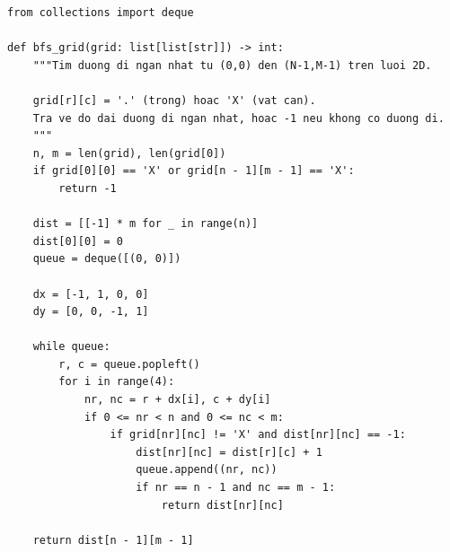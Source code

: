 \begin{lstlisting}
from collections import deque

def bfs_grid(grid: list[list[str]]) -> int:
    """Tim duong di ngan nhat tu (0,0) den (N-1,M-1) tren luoi 2D.

    grid[r][c] = '.' (trong) hoac 'X' (vat can).
    Tra ve do dai duong di ngan nhat, hoac -1 neu khong co duong di.
    """
    n, m = len(grid), len(grid[0])
    if grid[0][0] == 'X' or grid[n - 1][m - 1] == 'X':
        return -1

    dist = [[-1] * m for _ in range(n)]
    dist[0][0] = 0
    queue = deque([(0, 0)])

    dx = [-1, 1, 0, 0]
    dy = [0, 0, -1, 1]

    while queue:
        r, c = queue.popleft()
        for i in range(4):
            nr, nc = r + dx[i], c + dy[i]
            if 0 <= nr < n and 0 <= nc < m:
                if grid[nr][nc] != 'X' and dist[nr][nc] == -1:
                    dist[nr][nc] = dist[r][c] + 1
                    queue.append((nr, nc))
                    if nr == n - 1 and nc == m - 1:
                        return dist[nr][nc]

    return dist[n - 1][m - 1]
\end{lstlisting}
